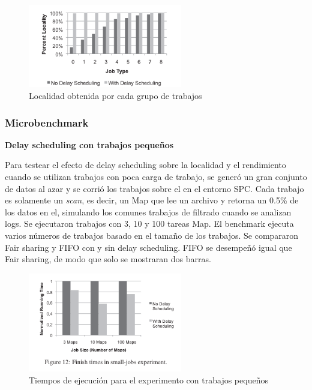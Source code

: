 \begin{figure}[H]
\begin{center}
\includegraphics[width=0.6\textwidth]{img/img4.png}
     \caption{Localidad obtenida por cada grupo de trabajos}
\end{center}
\end{figure}

\subsubsection{Microbenchmark}


\begin{center}
	\textbf{Delay scheduling con trabajos pequeños}
\end{center}

Para testear el efecto de delay scheduling sobre la localidad y el rendimiento cuando se utilizan trabajos con poca carga de trabajo, se generó un gran conjunto de datos al azar y se corrió los trabajos sobre el en el entorno SPC. Cada trabajo es solamente un \textit{scan}, es decir, un Map que lee un archivo y retorna un 0.5\% de los datos en el, simulando los comunes trabajos de filtrado cuando se analizan logs. Se ejecutaron trabajos con 3, 10 y 100 tareas Map. El benchmark ejecuta varios números de trabajos basado en el tamaño de los trabajos. Se compararon Fair sharing y FIFO con y sin delay scheduling. FIFO se desempeñó igual que Fair sharing, de modo que solo se mostraran dos barras.

\begin{figure}[H]
\begin{center}
\includegraphics[width=0.6\textwidth]{img/img5.png}
     \caption{Tiempos de ejecución para el experimento con trabajos pequeños}
\end{center}
\end{figure}

